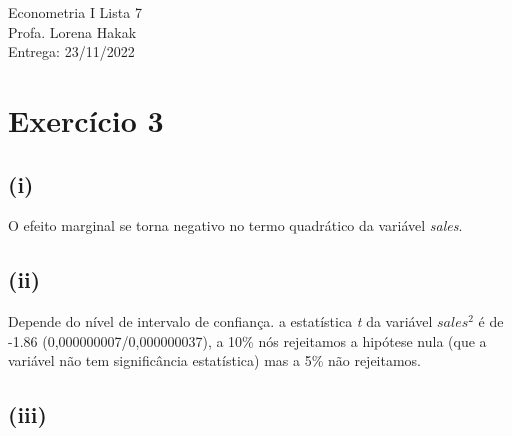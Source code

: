 \documentclass[hidelinks,11pt]{book}
\theoremstyle{definition}
\begin{document}
	
	\begin{center}
		{\Large Econometria I \hspace{0.5cm} Lista 7}\\
		Profa. Lorena Hakak\\
		Entrega: 23/11/2022
	\end{center}
	
	\vspace{0.2 cm}
	
	
	
	\section*{Exercício 3}
	
\subsection*{(i)}

O efeito marginal se torna negativo no termo quadrático da variável \textit{sales}.

\subsection*{(ii)}

Depende do nível de intervalo de confiança. a estatística \textit{t} da variável $sales^2$ é de -1.86 (0,000000007/0,000000037), a 10\% nós rejeitamos a hipótese nula (que a variável não tem significância estatística) mas a 5\% não rejeitamos.

\subsection*{(iii)}
\end{document}
